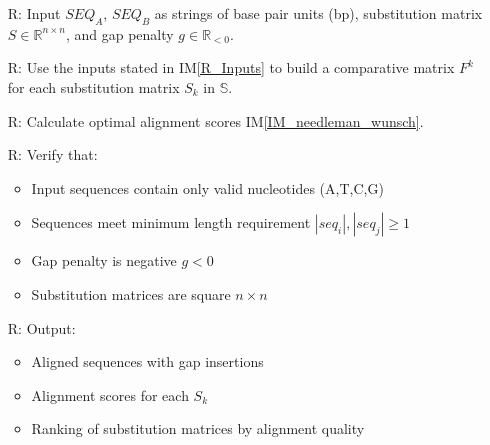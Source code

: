 \documentclass[12pt]{article}
\newcommand{\iref}[1]{IM\ref{#1}}
\newcounter{reqnum} %
\begin{document}
\noindent \begin{itemize}

\item[R\refstepcounter{reqnum}\thereqnum \label{R_Inputs}:] Input $SEQ_A$, $SEQ_B$ as 
strings of base pair units (bp), substitution matrix $S \in \mathbb{R}^{n \times n}$, and gap penalty $g \in \mathbb{R}_{<0}$.


\item[R\refstepcounter{reqnum}\thereqnum \label{R_OutputInputs}:] Use the inputs 
stated in \iref{R_Inputs} to build a comparative matrix $F^k$ for 
each substitution matrix $S_k$ in $\mathbb{S}$.


\item[R\refstepcounter{reqnum}\thereqnum \label{R_Calculate}:] Calculate optimal 
alignment scores \iref{IM_needleman_wunsch}.

\item[R\refstepcounter{reqnum}\thereqnum \label{R_VerifyOutput}:] Verify that:
\begin{itemize}
\item Input sequences contain only valid nucleotides (A,T,C,G)
\item Sequences meet minimum length requirement $|seq_i|, |seq_j| \geq 1$
\item Gap penalty is negative $g < 0$
\item Substitution matrices are square $n \times n$
\end{itemize}

\item[R\refstepcounter{reqnum}\thereqnum \label{R_Output}:] Output:
\begin{itemize}
\item Aligned sequences with gap insertions
\item Alignment scores for each $S_k$
\item Ranking of substitution matrices by alignment quality
\end{itemize}

\end{itemize}

\end{document}
